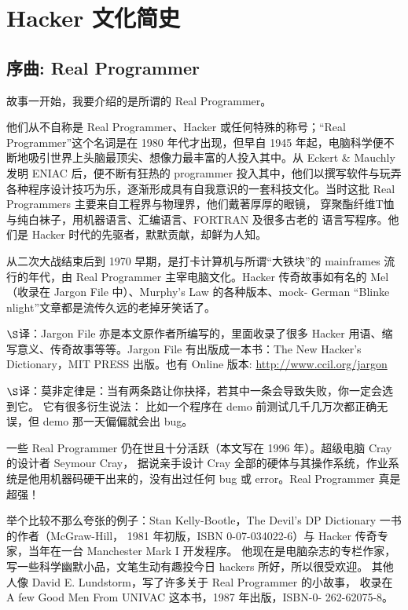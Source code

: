 \section{Hacker 文化简史}
\subsection{序曲: Real Programmer}

故事一开始，我要介绍的是所谓的 Real Programmer。

他们从不自称是 Real Programmer、Hacker 或任何特殊的称号；“Real Programmer”这个名词是在 1980 年代才出现，但早自 1945 年起，电脑科学便不断地吸引世界上头脑最顶尖、想像力最丰富的人投入其中。从 Eckert \& Mauchly 发明 ENIAC 后，便不断有狂热的 programmer 投入其中，他们以撰写软件与玩弄各种程序设计技巧为乐，逐渐形成具有自我意识的一套科技文化。当时这批 Real Programmers 主要来自工程界与物理界，他们戴著厚厚的眼镜， 穿聚酯纤维T恤与纯白袜子，用机器语言、汇编语言、FORTRAN 及很多古老的 语言写程序。他们是 Hacker 时代的先驱者，默默贡献，却鲜为人知。

从二次大战结束后到 1970 早期，是打卡计算机与所谓“大铁块”的 mainframes 流行的年代，由 Real Programmer 主宰电脑文化。Hacker 传奇故事如有名的 Mel （收录在 Jargon File 中）、Murphy's Law 的各种版本、mock- German “Blinke nlight”文章都是流传久远的老掉牙笑话了。

$\S$译：Jargon File 亦是本文原作者所编写的，里面收录了很多 Hacker 用语、缩写意义、传奇故事等等。Jargon File 有出版成一本书：The New Hacker's Dictionary，MIT PRESS 出版。也有 Online 版本: \url{http://www.ccil.org/jargon}

$\S$译：莫非定律是：当有两条路让你抉择，若其中一条会导致失败，你一定会选到它。 它有很多衍生说法： 比如一个程序在 demo 前测试几千几万次都正确无误，但 demo 那一天偏偏就会出 bug。

一些 Real Programmer 仍在世且十分活跃（本文写在 1996 年）。超级电脑 Cray 的设计者 Seymour Cray， 据说亲手设计 Cray 全部的硬体与其操作系统，作业系统是他用机器码硬干出来的，没有出过任何 bug 或 error。Real Programmer 真是超强！

举个比较不那么夸张的例子：Stan Kelly-Bootle，The Devil's DP Dictionary 一书的作者（McGraw-Hill， 1981 年初版，ISBN 0-07-034022-6）与 Hacker 传奇专家，当年在一台 Manchester Mark I 开发程序。 他现在是电脑杂志的专栏作家，写一些科学幽默小品，文笔生动有趣投今日 hackers 所好，所以很受欢迎。 其他人像 David E. Lundstorm，写了许多关于 Real Programmer 的小故事， 收录在 A few Good Men From UNIVAC 这本书，1987 年出版，ISBN-0- 262-62075-8。

